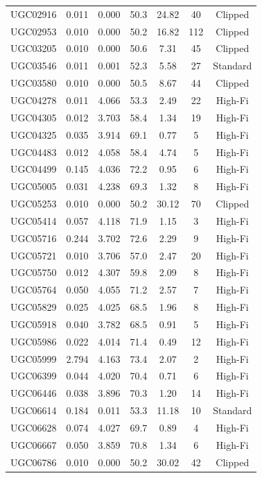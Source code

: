 \begin{longtable}{lcccccc}
UGC02916 & 0.011 & 0.000 & 50.3 & 24.82 & 40 & Clipped \\
UGC02953 & 0.010 & 0.000 & 50.2 & 16.82 & 112 & Clipped \\
UGC03205 & 0.010 & 0.000 & 50.6 & 7.31 & 45 & Clipped \\
UGC03546 & 0.011 & 0.001 & 52.3 & 5.58 & 27 & Standard \\
UGC03580 & 0.010 & 0.000 & 50.5 & 8.67 & 44 & Clipped \\
UGC04278 & 0.011 & 4.066 & 53.3 & 2.49 & 22 & High-Fi \\
UGC04305 & 0.012 & 3.703 & 58.4 & 1.34 & 19 & High-Fi \\
UGC04325 & 0.035 & 3.914 & 69.1 & 0.77 & 5 & High-Fi \\
UGC04483 & 0.012 & 4.058 & 58.4 & 4.74 & 5 & High-Fi \\
UGC04499 & 0.145 & 4.036 & 72.2 & 0.95 & 6 & High-Fi \\
UGC05005 & 0.031 & 4.238 & 69.3 & 1.32 & 8 & High-Fi \\
UGC05253 & 0.010 & 0.000 & 50.2 & 30.12 & 70 & Clipped \\
UGC05414 & 0.057 & 4.118 & 71.9 & 1.15 & 3 & High-Fi \\
UGC05716 & 0.244 & 3.702 & 72.6 & 2.29 & 9 & High-Fi \\
UGC05721 & 0.010 & 3.706 & 57.0 & 2.47 & 20 & High-Fi \\
UGC05750 & 0.012 & 4.307 & 59.8 & 2.09 & 8 & High-Fi \\
UGC05764 & 0.050 & 4.055 & 71.2 & 2.57 & 7 & High-Fi \\
UGC05829 & 0.025 & 4.025 & 68.5 & 1.96 & 8 & High-Fi \\
UGC05918 & 0.040 & 3.782 & 68.5 & 0.91 & 5 & High-Fi \\
UGC05986 & 0.022 & 4.014 & 71.4 & 0.49 & 12 & High-Fi \\
UGC05999 & 2.794 & 4.163 & 73.4 & 2.07 & 2 & High-Fi \\
UGC06399 & 0.044 & 4.020 & 70.4 & 0.71 & 6 & High-Fi \\
UGC06446 & 0.038 & 3.896 & 70.3 & 1.20 & 14 & High-Fi \\
UGC06614 & 0.184 & 0.011 & 53.3 & 11.18 & 10 & Standard \\
UGC06628 & 0.074 & 4.027 & 69.7 & 0.89 & 4 & High-Fi \\
UGC06667 & 0.050 & 3.859 & 70.8 & 1.34 & 6 & High-Fi \\
UGC06786 & 0.010 & 0.000 & 50.2 & 30.02 & 42 & Clipped \\

\end{longtable}
